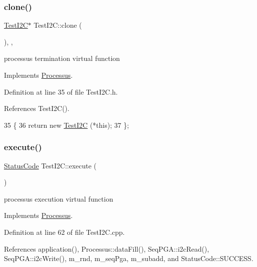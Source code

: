 \subsubsection{\texorpdfstring{clone()}{clone()}}
{\footnotesize\ttfamily \hyperlink{classTestI2C_1_1TestI2C}{Test\+I2C}$\ast$ Test\+I2\+C\+::clone (\begin{DoxyParamCaption}{ }\end{DoxyParamCaption})\hspace{0.3cm}{\ttfamily [inline]}, {\ttfamily [protected]}, {\ttfamily [virtual]}}

processus termination virtual function 

Implements \hyperlink{classProcessus_aca8856f6d6d7b7e1fe941f298dcbb502}{Processus}.



Definition at line 35 of file Test\+I2\+C.\+h.



References Test\+I2\+C().


\begin{DoxyCode}
35                   \{
36     \textcolor{keywordflow}{return} \textcolor{keyword}{new} \hyperlink{classTestI2C_a0fd4ba8d4696e9dd699b365ce91115e7}{TestI2C} (*\textcolor{keyword}{this});
37   \};
\end{DoxyCode}
\mbox{\label{classTestI2C_aafef0778386d8a60aa5fa6067ef7ea00}} 
\subsubsection{\texorpdfstring{execute()}{execute()}}
{\footnotesize\ttfamily \hyperlink{classStatusCode}{Status\+Code} Test\+I2\+C\+::execute (\begin{DoxyParamCaption}{ }\end{DoxyParamCaption})\hspace{0.3cm}{\ttfamily [virtual]}}

processus execution virtual function 

Implements \hyperlink{classProcessus_a63767a63a1fb0055c5aa45b21a4a5d58}{Processus}.



Definition at line 62 of file Test\+I2\+C.\+cpp.



References application(), Processus\+::data\+Fill(), Seq\+P\+G\+A\+::i2c\+Read(), Seq\+P\+G\+A\+::i2c\+Write(), m\+\_\+rnd, m\+\_\+seq\+Pga, m\+\_\+subadd, and Status\+Code\+::\+S\+U\+C\+C\+E\+SS.



